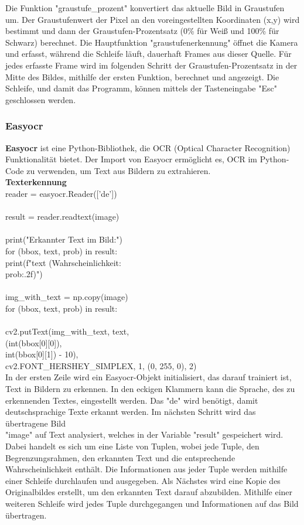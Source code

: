 {Die Funktion "graustufe\_prozent" konvertiert das aktuelle Bild in Graustufen um. Der Graustufenwert der Pixel an den voreingestellten Koordinaten (x,y) wird bestimmt und dann der Graustufen-Prozentsatz (0\% für Weiß und 100\% für Schwarz) berechnet. Die Hauptfunktion "graustufenerkennung" öffnet die Kamera und erfasst, während die Schleife läuft, dauerhaft Frames aus dieser Quelle. Für jedes erfasste Frame wird im folgenden Schritt der Graustufen-Prozentsatz in der Mitte des Bildes, mithilfe der ersten Funktion, berechnet und angezeigt. Die Schleife, und damit das Programm, können mittels der Tasteneingabe "Esc" geschlossen werden.\\


\subsubsection{Easyocr}
\textbf{Easyocr} ist eine Python-Bibliothek, die OCR (Optical Character Recognition) Funktionalität bietet. Der Import von Easyocr ermöglicht es, OCR im Python-Code zu verwenden, um Text aus Bildern zu extrahieren.\\


\textbf{Texterkennung}\\


reader = easyocr.Reader(['de'])\\
\\
result = reader.readtext(image)\\
\\
print("Erkannter Text im Bild:")\\
for (bbox, text, prob) in result:\\
print(f"{text} (Wahrscheinlichkeit:\\ {prob:.2f})")\\
\\
img\_with\_text = np.copy(image)\\
for (bbox, text, prob) in result:\\
\\
cv2.putText(img\_with\_text, text,\\ (int(bbox[0][0]), \\
int(bbox[0][1]) - 10),\\
cv2.FONT\_HERSHEY\_SIMPLEX, 1, (0, 255, 0), 2)\\



In der ersten Zeile wird ein Easyocr-Objekt initialisiert, das darauf trainiert ist, Text in Bildern zu erkennen. In den eckigen Klammern kann die Sprache, des zu erkennenden Textes, eingestellt werden. Das "de" wird benötigt, damit deutschsprachige Texte erkannt werden. Im nächsten Schritt wird das übertragene Bild \\"image" auf Text analysiert, welches in der Variable "result" gespeichert wird. Dabei handelt es sich um eine Liste von Tuplen, wobei jede Tuple, den Begrenzungsrahmen, den erkannten Text und die entsprechende Wahrscheinlichkeit enthält. Die Informationen aus jeder Tuple werden mithilfe einer Schleife durchlaufen und ausgegeben. Als Nächstes wird eine Kopie des Originalbildes erstellt, um den erkannten Text darauf abzubilden. Mithilfe einer weiteren Schleife wird jedes Tuple durchgegangen und Informationen auf das Bild übertragen.


}
